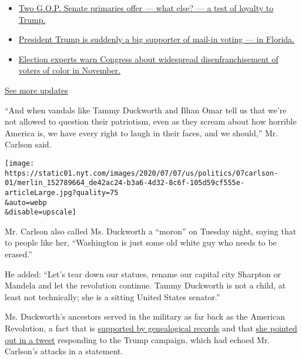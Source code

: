 \begin{itemize}
\tightlist
\item
  \href{https://www.nytimes.com/2020/08/04/us/elections/primary-election-michigan-arizona-kansas.html?action=click\&pgtype=Article\&state=default\&region=MAIN_CONTENT_1\&context=storylines_live_updates\#link-3924dd44}{Two
  G.O.P. Senate primaries offer --- what else? --- a test of loyalty to
  Trump.}
\item
  \href{https://www.nytimes.com/2020/08/04/us/elections/primary-election-michigan-arizona-kansas.html?action=click\&pgtype=Article\&state=default\&region=MAIN_CONTENT_1\&context=storylines_live_updates\#link-32b39e33}{President
  Trump is suddenly a big supporter of mail-in voting --- in Florida.}
\item
  \href{https://www.nytimes.com/2020/08/04/us/elections/primary-election-michigan-arizona-kansas.html?action=click\&pgtype=Article\&state=default\&region=MAIN_CONTENT_1\&context=storylines_live_updates\#link-6d019753}{Election
  experts warn Congress about widespread disenfranchisement of voters of
  color in November.}
\end{itemize}

\href{https://www.nytimes.com/2020/08/04/us/elections/primary-election-michigan-arizona-kansas.html?action=click\&pgtype=Article\&state=default\&region=MAIN_CONTENT_1\&context=storylines_live_updates}{See
more updates}

``And when vandals like Tammy Duckworth and Ilhan Omar tell us that
we're not allowed to question their patriotism, even as they scream
about how horrible America is, we have every right to laugh in their
faces, and we should,'' Mr. Carlson said.

\texttt{[image: https://static01.nyt.com/images/2020/07/07/us/politics/07carlson-01/merlin\_152789664\_de42ac24-b3a6-4d32-8c6f-105d59cf555e-articleLarge.jpg?quality=75\\\&auto=webp\\\&disable=upscale]}

Mr. Carlson also called Ms. Duckworth a ``moron'' on Tuesday night,
saying that to people like her, ``Washington is just some old white guy
who needs to be erased.''

He added: ``Let's tear down our statues, rename our capital city
Sharpton or Mandela and let the revolution continue. Tammy Duckworth is
not a child, at least not technically; she is a sitting United States
senator.''

Ms. Duckworth's ancestors served in the military as far back as the
American Revolution, a fact that is
\href{https://www.propublica.org/article/the-dig-tammy-duckworths-family-has-served-in-the-military-for-centuries}{supported
by genealogical records} and that
\href{https://twitter.com/TammyforIL/status/1280595475079598085}{she
pointed out in a tweet} responding to the Trump campaign, which had
echoed Mr. Carlson's attacks in a statement.

